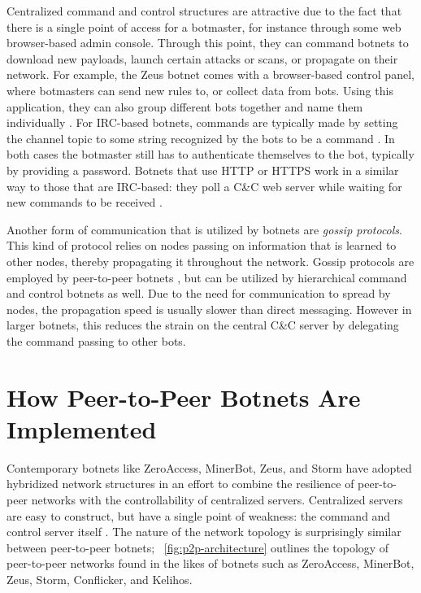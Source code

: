 \documentclass{acm_proc_article-sp}
\begin{document}
Centralized command and control structures are attractive due to the fact that there is a single point of access for a botmaster, for instance through some web browser-based admin console. Through this point, they can command botnets to download new payloads, launch certain attacks or scans, or propagate on their network. For example, the Zeus botnet comes with a browser-based control panel, where botmasters can send new rules to, or collect data from bots. Using this application, they can also group different bots together and name them individually \cite{blackhat:zeus}. For IRC-based botnets, commands are typically made by setting the channel topic to some string recognized by the bots to be a command \cite{honeynet:appendix}. In both cases the botmaster still has to authenticate themselves to the bot, typically by providing a password. Botnets that use HTTP or HTTPS work in a similar way to those that are IRC-based: they poll a C\&C web server while waiting for new commands to be received \cite{borgaonkar:analysis}.

Another form of communication that is utilized by botnets are \emph{gossip protocols}. This kind of protocol relies on nodes passing on information that is learned to other nodes, thereby propagating it throughout the network. Gossip protocols are employed by peer-to-peer botnets \cite{defcon:prowling}, but can be utilized by hierarchical command and control botnets as well. Due to the need for communication to spread by nodes, the propagation speed is usually slower than direct messaging. However in larger botnets, this reduces the strain on the central C\&C server by delegating the command passing to other bots.

%
%
%

\section{How Peer-to-Peer Botnets Are Implemented}

Contemporary botnets like ZeroAccess, MinerBot, Zeus, and Storm have adopted hybridized network structures in an effort to combine the resilience of peer-to-peer networks with the controllability of centralized servers.  Centralized servers are easy to construct, but have a single point of weakness: the command and control server itself \cite{wang:p2p}.  The nature of the network topology is surprisingly similar between peer-to-peer botnets;  ~\ref{fig:p2p-architecture} outlines the topology of peer-to-peer networks found in the likes of botnets such as ZeroAccess, MinerBot, Zeus, Storm, Conflicker, and Kelihos.
\end{document}
